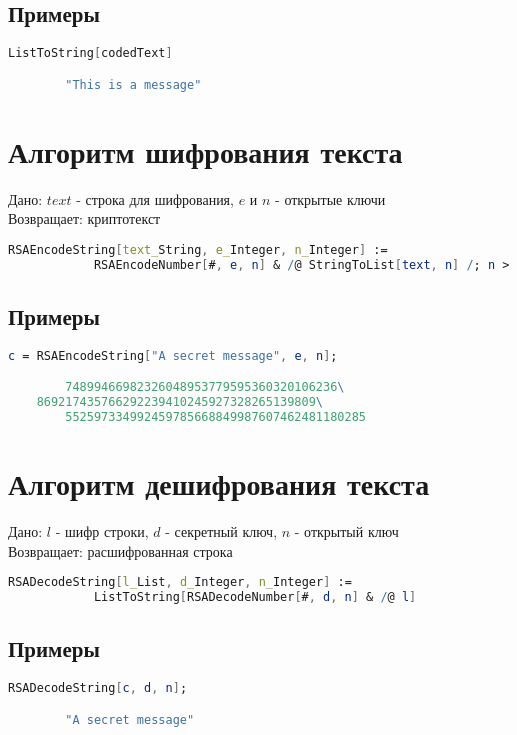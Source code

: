     	\subsection{Примеры}

    	\begin{lstlisting}[language=Mathematica,caption={
      		Пример	
    	}]
		ListToString[codedText]

		"This is a message"
    	\end{lstlisting}

	\section{Алгоритм шифрования текста}
		Дано: $text$ - строка для шифрования, $e$ и $n$ - открытые ключи \\
		Возвращает: криптотекст

		\begin{lstlisting}[language=Mathematica,caption={
      		Алгоритм шифрования текста
    	}]
		RSAEncodeString[text_String, e_Integer, n_Integer] := 
 			RSAEncodeNumber[#, e, n] & /@ StringToList[text, n] /; n > 256
    	\end{lstlisting}

    	\subsection{Примеры}

    	\begin{lstlisting}[language=Mathematica,caption={
      		Пример	
    	}]
		c = RSAEncodeString["A secret message", e, n];

		74899466982326048953779595360320106236\
    869217435766292239410245927328265139809\
		552597334992459785668849987607462481180285
    	\end{lstlisting}

	\section{Алгоритм дешифрования текста}
		Дано: $l$ - шифр строки, $d$ - секретный ключ, $n$ - открытый ключ \\
		Возвращает: расшифрованная строка

		\begin{lstlisting}[language=Mathematica,caption={
      		Алгоритм шифрования текста
    	}]
		RSADecodeString[l_List, d_Integer, n_Integer] := 
 			ListToString[RSADecodeNumber[#, d, n] & /@ l]
    	\end{lstlisting}

    	\subsection{Примеры}

    	\begin{lstlisting}[language=Mathematica,caption={
      		Пример	
    	}]
		RSADecodeString[c, d, n];

		"A secret message"
    	\end{lstlisting}

